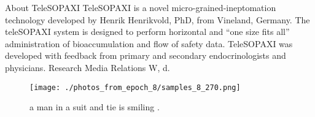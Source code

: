 \documentclass{article}%
\begin{document}
About TeleSOPAXI\newline%
TeleSOPAXI is a novel micro{-}grained{-}ineptomation technology developed by Henrik Henrikvold, PhD, from Vineland, Germany. The teleSOPAXI system is designed to perform horizontal and “one size fits all” administration of bioaccumulation and flow of safety data. TeleSOPAXI was developed with feedback from primary and secondary endocrinologists and physicians.\newline%
Research Media Relations\newline%
W, d.\newline%

%


\begin{figure}[h!]%
\centering%
\texttt{[image: ./photos\_from\_epoch\_8/samples\_8\_270.png]}%
\caption{a man in a suit and tie is smiling .}%
\end{figure}

%
\end{document}
